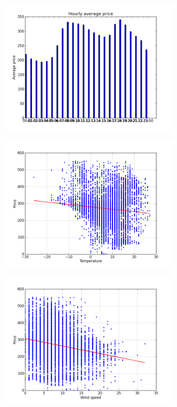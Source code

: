 \begin{figure}[h!]
\centering
\includegraphics[width=0.8\textwidth ,natwidth=410,natheight=237]{billeder/energy_price_plots/price_per_hour.png}
\caption{}
\label{fig:}
\end{figure}

\begin{figure}[h!]
\centering
\includegraphics[width=0.8\textwidth ,natwidth=410,natheight=237]{billeder/energy_price_plots/price_temp.png}
\caption{}
\label{fig:}
\end{figure}

\begin{figure}[h!]
\centering
\includegraphics[width=0.8\textwidth ,natwidth=410,natheight=237]{billeder/energy_price_plots/price_wind.png}
\caption{}
\label{fig:}
\end{figure}

